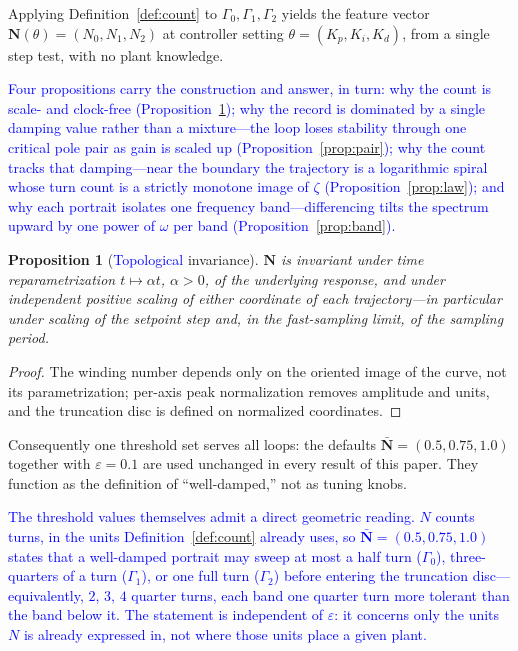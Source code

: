\documentclass[final,3p,times,twocolumn]{elsarticle}
\newcommand{\rev}[1]{\textcolor{blue}{#1}}  %
\newcommand{\revg}[1]{\textcolor{blue}{#1}} %
\newcommand{\revh}[1]{\textcolor{blue}{#1}} %
\newtheorem{proposition}{Proposition}
\begin{document}
Applying Definition~\ref{def:count} to $\Gamma_0, \Gamma_1, \Gamma_2$
yields the feature vector $\mathbf N(\theta) = (N_0, N_1, N_2)$ at
controller setting $\theta = (K_p, K_i, K_d)$, from a single step test,
with no plant knowledge.

\revh{Four propositions carry the construction and answer, in turn:
why the count is scale- and clock-free
(Proposition~\ref{prop:invariance}); why the record is dominated by a
single damping value rather than a mixture---the loop loses stability
through one critical pole pair as gain is scaled up
(Proposition~\ref{prop:pair}); why the count tracks that
damping---near the boundary the trajectory is a logarithmic spiral
whose turn count is a strictly monotone image of $\zeta$
(Proposition~\ref{prop:law}); and why each portrait isolates one
frequency band---differencing tilts the spectrum upward by one power
of $\omega$ per band (Proposition~\ref{prop:band}).}

\begin{proposition}[\revg{Topological} invariance]\label{prop:invariance}
$\mathbf N$ is invariant under time reparametrization $t \mapsto \alpha t$,
$\alpha > 0$, of the underlying response, and under independent positive
scaling of either coordinate of each trajectory---in particular under
scaling of the setpoint step and, in the fast-sampling limit, of the
sampling period.
\end{proposition}

\begin{proof}
The winding number depends only on the oriented image of the curve, not
its parametrization; per-axis peak normalization removes amplitude and
units, and the truncation disc is defined on normalized coordinates.
\end{proof}

\begin{sloppypar}
Consequently one threshold set serves all loops: the defaults
$\bar{\mathbf N} = (0.5, 0.75, 1.0)$ together with $\varepsilon = 0.1$
are used unchanged in every result of this paper. They function as the
definition of ``well-damped,'' not as tuning knobs.
\end{sloppypar}

\rev{The threshold values themselves admit a direct geometric reading.
$N$ counts turns, in the units Definition~\ref{def:count} already
uses, so $\bar{\mathbf N} = (0.5, 0.75, 1.0)$ states that a well-damped
portrait may sweep at most a half turn ($\Gamma_0$), three-quarters of
a turn ($\Gamma_1$), or one full turn ($\Gamma_2$) before entering the
truncation disc---equivalently, $2$, $3$, $4$ quarter turns, each band
one quarter turn more tolerant than the band below it. The statement
is independent of $\varepsilon$: it concerns only the units $N$ is
already expressed in, not where those units place a given plant.}
\end{document}
